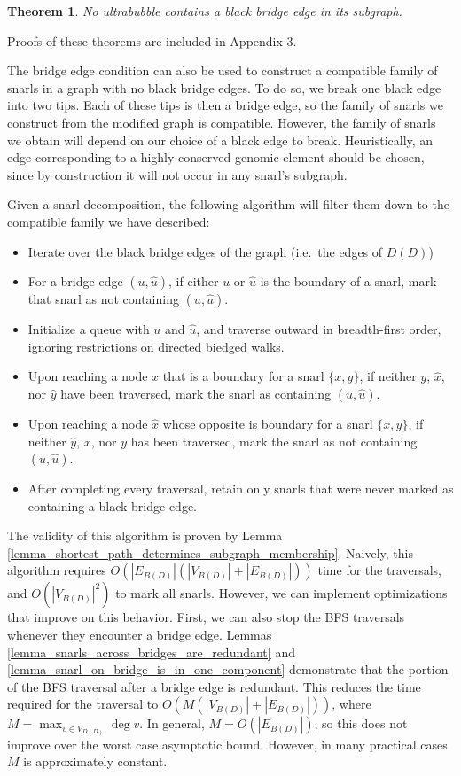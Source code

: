 \documentclass[11pt]{ucthesis}
\newtheorem{theorem}{Theorem}
\begin{document}
\begin{theorem}
	No ultrabubble contains a black bridge edge in its subgraph.
	\label{theorem_ultrabubbles_have_no_bridges}
\end{theorem}

\noindent Proofs of these theorems are included in Appendix 3.	

The bridge edge condition can also be used to construct a compatible family of snarls in a graph with no black bridge edges. To do so, we break one black edge into two tips. Each of these tips is then a bridge edge, so the family of snarls we construct from the modified graph is compatible. However, the family of snarls we obtain will depend on our choice of a black edge to break.  Heuristically, an edge corresponding to a highly conserved genomic element should be chosen, since by construction it will not occur in any snarl's subgraph.

Given a snarl decomposition, the following algorithm will filter them down to the compatible family we have described:

\begin{itemize}
	\item Iterate over the black bridge edges of the graph (i.e.\ the edges of $D(D)$)
	\item For a bridge edge $(u, \hat u)$, if either $u$ or $\hat u$ is the boundary of a snarl, mark that snarl as not containing $(u, \hat u)$.
	\item Initialize a queue with $u$ and $\hat u$, and traverse outward in breadth-first order, ignoring restrictions on directed biedged walks. 
	\item Upon reaching a node $x$ that is a boundary for a snarl $\{x,y\}$, if neither $y$, $\hat x$, nor $\hat y$ have been traversed, mark the snarl as containing $(u, \hat u)$.
 	\item Upon reaching a node $\hat x$ whose opposite is boundary for a snarl $\{x,y\}$, if neither $\hat y$, $x$, nor $y$ has been traversed, mark the snarl as not containing $(u, \hat u)$.
 	\item After completing every traversal, retain only snarls that were never marked as containing a black bridge edge.
\end{itemize}

The validity of this algorithm is proven by Lemma \ref{lemma_shortest_path_determines_subgraph_membership}. Naively, this algorithm requires $O(|E_{B(D)}|(|V_{B(D)}| + |E_{B(D)}|))$ time for the traversals, and $O(|V_{B(D)}|^2)$ to mark all snarls. However, we can implement optimizations that improve on this behavior. First, we can also stop the BFS traversals whenever they encounter a bridge edge. Lemmas \ref{lemma_snarls_across_bridges_are_redundant} and \ref{lemma_snarl_on_bridge_is_in_one_component} demonstrate that the portion of the BFS traversal after a bridge edge is redundant. This reduces the time required for the traversal to $O(M(|V_{B(D)}| + |E_{B(D)}|))$, where $M = \max_{v \in V_{D(D)}} \deg v$. In general, $M = O(|E_{B(D)}|)$, so this does not improve over the worst case asymptotic bound. However, in many practical cases $M$ is approximately constant. 
\end{document}
